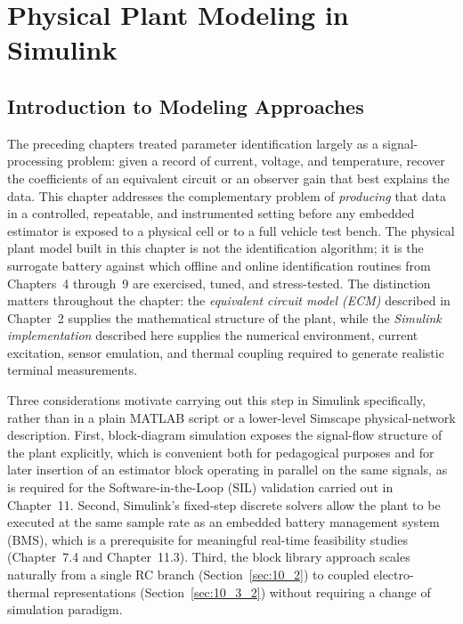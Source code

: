 
\chapter{Physical Plant Modeling in Simulink}
\label{ch:simulink_plant}

\section{Introduction to Modeling Approaches}
\label{sec:10_intro}

The preceding chapters treated parameter identification largely as a
signal-processing problem: given a record of current, voltage, and
temperature, recover the coefficients of an equivalent circuit or an
observer gain that best explains the data. This chapter addresses the
complementary problem of \emph{producing} that data in a controlled,
repeatable, and instrumented setting before any embedded estimator is
exposed to a physical cell or to a full vehicle test bench. The
physical plant model built in this chapter is not the identification
algorithm; it is the surrogate battery against which offline and
online identification routines from Chapters~4 through~9 are
exercised, tuned, and stress-tested. The distinction matters
throughout the chapter: the \emph{equivalent circuit model (ECM)}
described in Chapter~2 supplies the mathematical structure of the
plant, while the \emph{Simulink implementation} described here supplies
the numerical environment, current excitation, sensor emulation, and
thermal coupling required to generate realistic terminal measurements.

Three considerations motivate carrying out this step in Simulink
specifically, rather than in a plain MATLAB script or a lower-level
Simscape physical-network description. First, block-diagram
simulation exposes the signal-flow structure of the plant explicitly,
which is convenient both for pedagogical purposes and for later
insertion of an estimator block operating in parallel on the same
signals, as is required for the Software-in-the-Loop (SIL) validation
carried out in Chapter~11. Second, Simulink's fixed-step discrete
solvers allow the plant to be executed at the same sample rate as an
embedded battery management system (BMS), which is a prerequisite for
meaningful real-time feasibility studies (Chapter~7.4 and
Chapter~11.3). Third, the block library approach scales naturally from
a single RC branch (Section~\ref{sec:10_2}) to coupled electro-thermal
representations (Section~\ref{sec:10_3_2}) without requiring a
change of simulation paradigm.

